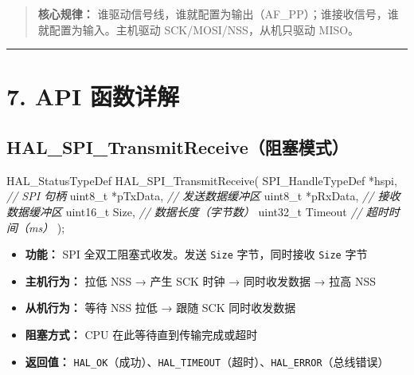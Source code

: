 \documentclass[
  chinese,
  UTF8,
  oneside,
  openany]{ctexbook}
\newenvironment{Shaded}{}{}
\newcommand{\CommentTok}[1]{\textcolor[rgb]{0.38,0.63,0.69}{\textit{#1}}}
\newcommand{\DataTypeTok}[1]{\textcolor[rgb]{0.56,0.13,0.00}{#1}}
\newcommand{\NormalTok}[1]{#1}
\newcommand{\OperatorTok}[1]{\textcolor[rgb]{0.40,0.40,0.40}{#1}}
\providecommand{\tightlist}{%
  \setlength{\itemsep}{0pt}\setlength{\parskip}{0pt}}
\begin{document}
\begin{quote}
\textbf{核心规律：}
谁驱动信号线，谁就配置为输出（AF\_PP）；谁接收信号，谁就配置为输入。主机驱动
SCK/MOSI/NSS，从机只驱动 MISO。
\end{quote}

\begin{center}\rule{0.5\linewidth}{0.5pt}\end{center}

\section{7. API 函数详解}\label{api-ux51fdux6570ux8be6ux89e3-3}

\subsection{HAL\_SPI\_TransmitReceive（阻塞模式）}\label{hal_spi_transmitreceiveux963bux585eux6a21ux5f0f}

\begin{Shaded}
\begin{Highlighting}[]
\NormalTok{HAL\_StatusTypeDef HAL\_SPI\_TransmitReceive}\OperatorTok{(}
\NormalTok{    SPI\_HandleTypeDef }\OperatorTok{*}\NormalTok{hspi}\OperatorTok{,}   \CommentTok{// SPI 句柄}
    \DataTypeTok{uint8\_t}           \OperatorTok{*}\NormalTok{pTxData}\OperatorTok{,} \CommentTok{// 发送数据缓冲区}
    \DataTypeTok{uint8\_t}           \OperatorTok{*}\NormalTok{pRxData}\OperatorTok{,} \CommentTok{// 接收数据缓冲区}
    \DataTypeTok{uint16\_t}\NormalTok{           Size}\OperatorTok{,}    \CommentTok{// 数据长度（字节数）}
    \DataTypeTok{uint32\_t}\NormalTok{           Timeout  }\CommentTok{// 超时时间（ms）}
\OperatorTok{);}
\end{Highlighting}
\end{Shaded}

\begin{itemize}
\tightlist
\item
  \textbf{功能：} SPI 全双工阻塞式收发。发送 \texttt{Size}
  字节，同时接收 \texttt{Size} 字节
\item
  \textbf{主机行为：} 拉低 NSS → 产生 SCK 时钟 → 同时收发数据 → 拉高 NSS
\item
  \textbf{从机行为：} 等待 NSS 拉低 → 跟随 SCK 同时收发数据
\item
  \textbf{阻塞方式：} CPU 在此等待直到传输完成或超时
\item
  \textbf{返回值：}
  \texttt{HAL\_OK}（成功）、\texttt{HAL\_TIMEOUT}（超时）、\texttt{HAL\_ERROR}（总线错误）
\end{itemize}
\end{document}
